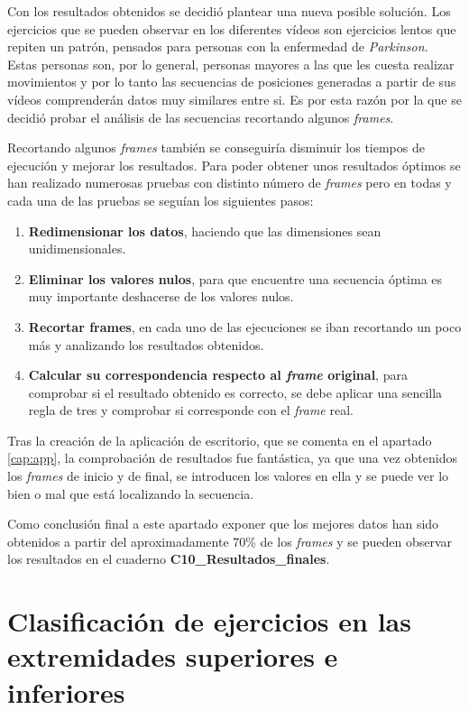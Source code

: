 Con los resultados obtenidos se decidió plantear una nueva posible solución. Los ejercicios que se pueden observar en los diferentes vídeos son ejercicios lentos que repiten un patrón, pensados para personas con la enfermedad de \textit{Parkinson}. Estas personas son, por lo general, personas mayores a las que les cuesta realizar movimientos y por lo tanto las secuencias de posiciones generadas a partir de sus vídeos comprenderán datos muy similares entre si. Es por esta razón por la que se decidió probar el análisis de las secuencias recortando algunos \textit{frames}. 

Recortando algunos \textit{frames} también se conseguiría disminuir los tiempos de ejecución y mejorar los resultados. Para poder obtener unos resultados óptimos se han realizado numerosas pruebas con distinto número de \textit{frames} pero en todas y cada una de las pruebas se seguían los siguientes pasos:
\begin{enumerate}
    \item \textbf{Redimensionar los datos}, haciendo que las dimensiones sean unidimensionales.
    \item \textbf{Eliminar los valores nulos}, para que encuentre una secuencia óptima es muy importante deshacerse de los valores nulos. 
    \item \textbf{Recortar frames}, en cada uno de las ejecuciones se iban recortando un poco más y analizando los resultados obtenidos.
    \item \textbf{Calcular su correspondencia respecto al \textit{frame} original}, para comprobar si el resultado obtenido es correcto, se debe aplicar una sencilla regla de tres y comprobar si corresponde con el \textit{frame} real. 
\end{enumerate}

Tras la creación de la aplicación de escritorio, que se comenta en el apartado \ref{cap:app}, la comprobación de resultados fue fantástica, ya que una vez obtenidos los \textit{frames} de inicio y de final, se introducen los valores en ella y se puede ver lo bien o mal que está localizando la secuencia. 

\begin{tcolorbox}
Como conclusión final a este apartado exponer que los mejores datos han sido obtenidos a partir del aproximadamente 70\% de los \textit{frames} y se pueden observar los resultados en el cuaderno \textbf{C10\_Resultados\_finales}.
\end{tcolorbox}


\section{Clasificación de ejercicios en las extremidades superiores e inferiores}

